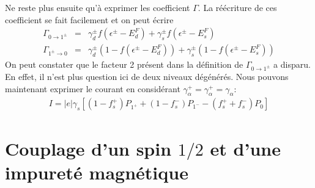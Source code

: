 Ne reste plus ensuite qu'à exprimer les coefficient $\Gamma$. La réécriture de ces coefficient se fait facilement et on peut écrire 
\begin{eqnarray}
\Gamma_{0 \rightarrow 1^\pm} &=&  \gamma_d^\pm f(\epsilon^\pm - E_d^F) + \gamma_s^\pm f(\epsilon^\pm - E_s^F)\\
\Gamma_{1^\pm \rightarrow 0} &=& \gamma_d^\pm (1- f(\epsilon^\pm - E_d^F)) + \gamma_s^\pm (1- f(\epsilon^\pm - E_s^F)) 
\end{eqnarray}
On peut constater que le facteur 2 présent dans la définition de $\Gamma_{0 \rightarrow 1^\pm}$ a disparu. En effet, il n'est plus question ici de deux niveaux dégénérés. Nous pouvons maintenant exprimer le courant en considérant $\gamma_{\alpha}^+ = \gamma_{\alpha}^+ = \gamma_{\alpha}$:
\begin{eqnarray}
I = |e| \gamma_s [(1 - f_s^+)P_{1^+} + (1-f_s^-)P_{1^-} - (f_s^+ + f_s^-)P_0]
\end{eqnarray}

\section{Couplage d'un spin $1/2$ et d'une impureté magnétique}